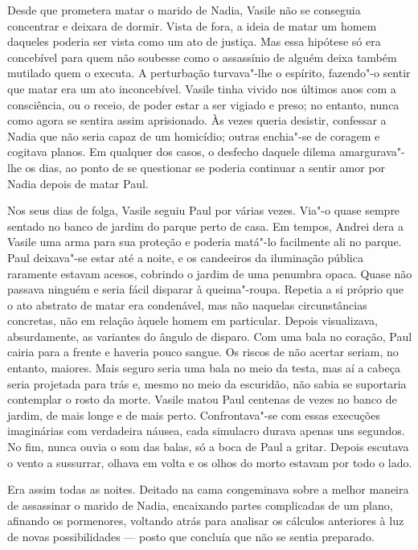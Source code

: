 Desde que prometera matar o marido de Nadia, Vasile não se conseguia
concentrar e deixara de dormir. Vista de fora, a ideia de matar um homem
daqueles poderia ser vista como um ato de justiça. Mas essa hipótese só
era concebível para quem não soubesse como o assassínio de alguém deixa
também mutilado quem o executa. A perturbação turvava"-lhe o espírito,
fazendo"-o sentir que matar era um ato inconcebível. Vasile tinha vivido
nos últimos anos com a consciência, ou o receio, de poder estar a ser
vigiado e preso; no entanto, nunca como agora se sentira assim
aprisionado. Às vezes queria desistir, confessar a Nadia que não seria
capaz de um homicídio; outras enchia"-se de coragem e cogitava planos. Em qualquer dos casos, o desfecho
daquele dilema amargurava"-lhe os dias, ao ponto
de se questionar se poderia continuar a sentir amor por Nadia depois de
matar Paul.

Nos seus dias de folga, Vasile seguiu Paul por várias vezes. Via"-o quase
sempre sentado no banco de jardim do parque perto de casa. Em tempos,
Andrei dera a Vasile uma arma para sua proteção e poderia matá"-lo
facilmente ali no parque. Paul deixava"-se estar até a noite, e os
candeeiros da iluminação pública raramente estavam acesos, cobrindo o
jardim de uma penumbra opaca. Quase não passava ninguém e seria fácil
disparar à queima"-roupa. Repetia a si próprio que o ato abstrato de
matar era condenável, mas não naquelas circunstâncias concretas, não em
relação àquele homem em particular. Depois visualizava, absurdamente,
as variantes do ângulo de disparo. Com uma bala no coração, Paul cairia
para a frente e haveria pouco sangue. Os riscos de não acertar seriam,
no entanto, maiores. Mais seguro seria uma bala no meio da testa, mas aí
a cabeça seria projetada para trás e, mesmo no meio da escuridão, não
sabia se suportaria contemplar o rosto da morte. Vasile matou Paul
centenas de vezes no banco de jardim, de mais longe e de mais perto.
Confrontava"-se com essas execuções imaginárias com verdadeira náusea, cada simulacro durava apenas uns segundos. No fim, nunca ouvia o
som das balas, só a boca de Paul a gritar. Depois escutava o vento a
sussurrar, olhava em volta e os olhos do morto estavam por todo o lado.

Era assim todas as noites. Deitado na cama congeminava sobre a melhor
maneira de assassinar o marido de Nadia, encaixando partes complicadas
de um plano, afinando os pormenores, voltando atrás para analisar os
cálculos anteriores à luz de novas possibilidades --- posto que concluía
que não se sentia preparado.

